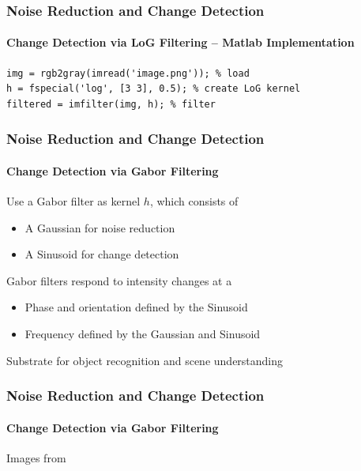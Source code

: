 \documentclass[xetex,professionalfont]{beamer}
\begin{document}

\begin{frame}[fragile]
\frametitle{Noise Reduction and Change Detection}
\framesubtitle{Change Detection via LoG Filtering -- Matlab Implementation}

\begin{verbatim}
img = rgb2gray(imread('image.png')); % load
h = fspecial('log', [3 3], 0.5); % create LoG kernel
filtered = imfilter(img, h); % filter
\end{verbatim}

\end{frame}


\begin{frame}
\frametitle{Noise Reduction and Change Detection}
\framesubtitle{Change Detection via Gabor Filtering}

Use a Gabor filter as kernel $h$, which consists of
\begin{itemize}
	\item A Gaussian for noise reduction
	\item A Sinusoid for change detection 
\end{itemize}

\bigskip
Gabor filters respond to intensity changes at a
\begin{itemize}
	\item Phase and orientation defined by the Sinusoid %
	\item Frequency defined by the Gaussian and Sinusoid
\end{itemize}

\bigskip
Substrate for object recognition and scene understanding

\end{frame}


\begin{frame}
\frametitle{Noise Reduction and Change Detection}
\framesubtitle{Change Detection via Gabor Filtering}

\begin{center}
	{\centering Images from \cite{prince12}}
\end{center}

\end{frame}
\end{document}
